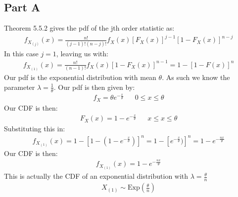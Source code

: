 \documentclass{article}
\begin{document}
\subsection*{Part A}
Theorem 5.5.2 gives the pdf of the jth order statistic as:
\begin{align*}
f_{X_{(j)}}(x) = \frac{n!}{(j-1)!(n-j)!} f_X(x) [F_X(x)]^{j-1} [1-F_X(x)]^{n-j}
\end{align*}
In this case $j=1$, leaving us with:
\begin{align*}
f_{X_{(1)}}(x) = \frac{n!}{(n-1)!} f_X(x) [1-F_X(x)]^{n-1} = 1-[1-F(x)]^n
\end{align*}
Our pdf is the exponential distribution with mean $\theta$. As such we know the parameter $\lambda=\tfrac{1}{\theta}$. Our pdf is then given by:
\begin{align*}
f_X = \theta e^{-\tfrac{x}{\theta}} && 0 \leq x \leq \theta
\end{align*}
Our CDF is then:
\begin{align*}
F_X(x) = 1-e^{-\tfrac{x}{\theta}} && x \leq x \leq \theta
\end{align*}
Substituting this in:
\begin{align*}
f_{X_{(1)}}(x) = 1-[1-(1-e^{-\tfrac{x}{\theta}})]^n = 1-[e^{-\tfrac{x}{\theta}})]^n = 1-e^{-\tfrac{nx}{\theta}}
\end{align*}
Our CDF is then:
\begin{align*}
f_{X_{(1)}}(x) = 1-e^{-\tfrac{nx}{\theta}}
\end{align*}
This is actually the CDF of an exponential distribution with $\lambda = \tfrac{\theta}{n}$
\begin{align*}
\boxed{ X_{(1)} \sim \text{Exp}(\tfrac{\theta}{n}) }
\end{align*}
\end{document}
